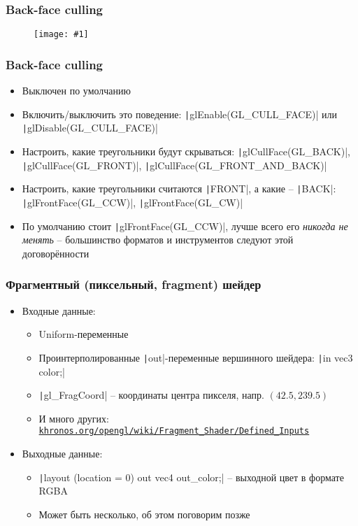 \documentclass[10pt]{beamer}
\newcommand{\slideimage}[1]{
  \begin{figure}
    \begin{adjustbox}{width=\textwidth, totalheight=\textheight-2\baselineskip-2\baselineskip,keepaspectratio}
      \texttt{[image: \#1]}
    \end{adjustbox}
  \end{figure}
}
\begin{document}
\begin{frame}
\frametitle{Back-face culling}
\slideimage{back-face-culling.png}
\end{frame}


\begin{frame}[fragile]
\frametitle{Back-face culling}
\begin{itemize}
\item Выключен по умолчанию
\pause
\item Включить/выключить это поведение: \texttt|glEnable(GL_CULL_FACE)| или \texttt|glDisable(GL_CULL_FACE)|
\pause
\item Настроить, какие треугольники будут скрываться: \texttt|glCullFace(GL_BACK)|, \texttt|glCullFace(GL_FRONT)|, \texttt|glCullFace(GL_FRONT_AND_BACK)|
\pause
\item Настроить, какие треугольники считаются \texttt|FRONT|, а какие -- \texttt|BACK|: \texttt|glFrontFace(GL_CCW)|, \texttt|glFrontFace(GL_CW)|
\pause
\item По умолчанию стоит \texttt|glFrontFace(GL_CCW)|, лучше всего его \textit{никогда не менять} -- большинство форматов и инструментов следуют этой договорённости
\end{itemize}
\end{frame}

\begin{frame}[fragile]
\frametitle{Фрагментный (пиксельный, fragment) шейдер}
\begin{itemize}
\pause
\item Входные данные:
\pause
\begin{itemize}
\item Uniform-переменные
\pause
\item Проинтерполированные \texttt|out|-переменные вершинного шейдера: \texttt|in vec3 color;|
\pause
\item \texttt|gl_FragCoord| -- координаты центра пикселя, напр. \begin{math}(42.5, 239.5)\end{math}
\pause
\item И много других: \href{https://www.khronos.org/opengl/wiki/Fragment_Shader/Defined_Inputs}{\nolinkurl{khronos.org/opengl/wiki/Fragment\_Shader/Defined\_Inputs}}
\end{itemize}
\pause
\item Выходные данные:
\begin{itemize}
\item \texttt|layout (location = 0) out vec4 out_color;| -- выходной цвет в формате RGBA
\pause
\item Может быть несколько, об этом поговорим позже
\end{itemize}
\end{itemize}
\end{frame}
\end{document}
